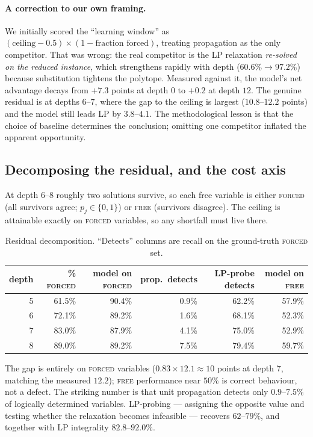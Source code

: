 \documentclass[12pt]{article}
\begin{document}
\paragraph{A correction to our own framing.} We initially scored the ``learning window'' as $(\mathrm{ceiling}-0.5)\times(1-\text{fraction forced})$, treating propagation as the only competitor. That was wrong: the real competitor is the LP relaxation \emph{re-solved on the reduced instance}, which strengthens rapidly with depth ($60.6\%\to97.2\%$) because substitution tightens the polytope. Measured against it, the model's net advantage decays from $+7.3$ points at depth $0$ to $+0.2$ at depth $12$. The genuine residual is at depths $6$--$7$, where the gap to the ceiling is largest ($10.8$--$12.2$ points) and the model still leads LP by $3.8$--$4.1$. The methodological lesson is that the choice of baseline determines the conclusion; omitting one competitor inflated the apparent opportunity.

\subsection{Decomposing the residual, and the cost axis}
\label{sec:cost}

At depth $6$--$8$ roughly two solutions survive, so each free variable is either \textsc{forced} (all survivors agree; $p_j\in\{0,1\}$) or \textsc{free} (survivors disagree). The ceiling is attainable exactly on \textsc{forced} variables, so any shortfall must live there.

\begin{table}[h]
\centering
\begin{tabular}{rrrrrr}
\toprule
depth & \% \textsc{forced} & model on \textsc{forced} & prop.\ detects & LP-probe detects & model on \textsc{free} \\
\midrule
5 & 61.5\% & 90.4\% & 0.9\% & 62.2\% & 57.9\% \\
6 & 72.1\% & 89.2\% & 1.6\% & 68.1\% & 52.3\% \\
7 & 83.0\% & 87.9\% & 4.1\% & 75.0\% & 52.9\% \\
8 & 89.0\% & 89.2\% & 7.5\% & 79.4\% & 59.7\% \\
\bottomrule
\end{tabular}
\caption{Residual decomposition. ``Detects'' columns are recall on the ground-truth \textsc{forced} set.}
\label{tab:gap}
\end{table}

The gap is entirely on \textsc{forced} variables ($0.83\times12.1\approx10$ points at depth $7$, matching the measured $12.2$); \textsc{free} performance near $50\%$ is correct behaviour, not a defect. The striking number is that unit propagation detects only $0.9$--$7.5\%$ of logically determined variables. LP-probing --- assigning the opposite value and testing whether the relaxation becomes infeasible --- recovers $62$--$79\%$, and together with LP integrality $82.8$--$92.0\%$.
\end{document}
